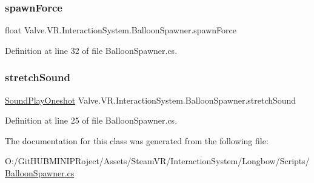 \subsubsection{\texorpdfstring{spawnForce}{spawnForce}}
{\footnotesize\ttfamily float Valve.\+V\+R.\+Interaction\+System.\+Balloon\+Spawner.\+spawn\+Force}



Definition at line 32 of file Balloon\+Spawner.\+cs.

\mbox{\label{class_valve_1_1_v_r_1_1_interaction_system_1_1_balloon_spawner_a82d94aaf885611fe99ac11254e0217cf}} 
\subsubsection{\texorpdfstring{stretchSound}{stretchSound}}
{\footnotesize\ttfamily \mbox{\hyperlink{class_valve_1_1_v_r_1_1_interaction_system_1_1_sound_play_oneshot}{Sound\+Play\+Oneshot}} Valve.\+V\+R.\+Interaction\+System.\+Balloon\+Spawner.\+stretch\+Sound}



Definition at line 25 of file Balloon\+Spawner.\+cs.



The documentation for this class was generated from the following file\+:\begin{DoxyCompactItemize}
\item 
O\+:/\+Git\+H\+U\+B\+M\+I\+N\+I\+P\+Roject/\+Assets/\+Steam\+V\+R/\+Interaction\+System/\+Longbow/\+Scripts/\mbox{\hyperlink{_balloon_spawner_8cs}{Balloon\+Spawner.\+cs}}\end{DoxyCompactItemize}
